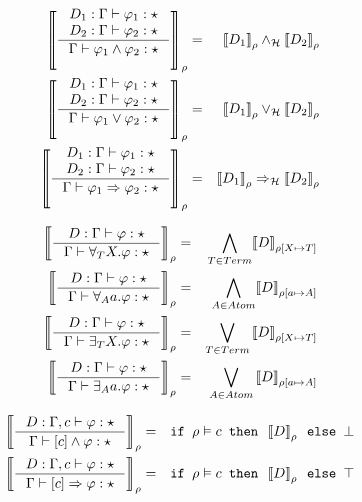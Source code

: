 \documentclass[english, mgr]{iithesis}
\begin{document}
\begin{eqnarray*}
    \interp{
        \inference{D_1 : \types{\formphi_1 }{\kProp} \\ D_2 : \types{\formphi_2 }{\kProp}
    }{
        \types{\formphi_1 \wedge \formphi_2}{\kProp}}
    } & = & \interp{D_1} \wedge_\PropAlg \interp{D_2} \\
    \interp{
        \inference{D_1 : \types{\formphi_1 }{\kProp}  \\ D_2 : \types{\formphi_2 }{\kProp}
    }{
        \types{\formphi_1 \vee \formphi_2}{\kProp}}
    } & = & \interp{D_1} \vee_\PropAlg \interp{D_2} \\
    \interp{
        \inference{D_1 : \types{\formphi_1 }{\kProp}  \\ D_2 : \types{\formphi_2 }{\kProp}
    }{
        \types{\formphi_1 \Rightarrow \formphi_2}{\kProp}}
    } & = & \interp{D_1} \Rightarrow_\PropAlg \interp{D_2}
\end{eqnarray*}

\begin{eqnarray*}
    \interp{
        \inference{D : \types{\formphi}{\kProp}
    }{
        \types{\fForallTerm{\termv}\formphi}{\kProp}}
    } & = & \underset{T \in Term}{\bigwedge} {\interp[{\tmEnv [\termv \mapsto T]}]{D}}  \\
    \interp{
        \inference{D : \types{\formphi}{\kProp}
    }{
        \types{\fForallAtom{\atomv}\formphi}{\kProp}}
    } & = & \underset{A \in Atom}{\bigwedge} {\interp[{\tmEnv [\atomv \mapsto A]}]{D}} \\
    \interp{
        \inference{D : \types{\formphi}{\kProp}
    }{
        \types{\fExistsTerm{\termv} \formphi}{\kProp}}
    } & = & \underset{T \in Term}{\bigvee}\interp[{\tmEnv [\termv \mapsto T]}]{D} \\
    \interp{
        \inference{D : \types{\formphi}{\kProp}
    }{
        \types{\fExistsAtom{\atomv} \formphi}{\kProp}}
    } & = & \underset{A \in Atom}{\bigvee} \interp[{\tmEnv [\atomv \mapsto A]}]{D}
\end{eqnarray*}

\begin{eqnarray*}
   \interp{
        \inference{D : \types[\Gamma, c]{\formphi}{\kProp}
    }{
        \types{[c] \wedge \formphi}{\kProp}}
    } & = &  \texttt{if } \tmEnv \vDash c \texttt{ then } \interp{D} \texttt{ else } \bot
    \\
    \interp{
        \inference{D : \types[\Gamma, c]{\formphi}{\kProp}
    }{
        \types{[c] \Rightarrow \formphi}{\kProp}}
    } & = &  \texttt{if } \tmEnv \vDash c \texttt{ then } \interp{D} \texttt{ else } \top
\end{eqnarray*}
\end{document}
